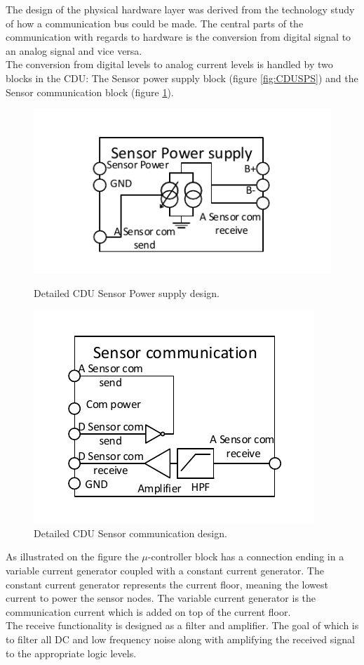 The design of the physical hardware layer was derived from the technology study of how a communication bus could be made. The central parts of the communication with regards to hardware is the conversion from digital signal to an analog signal and vice versa.\\ 
The conversion from digital levels to analog current levels is handled by two blocks in the CDU: The Sensor power supply block (figure \ref{fig:CDUSPS}) and the Sensor communication block (figure \ref{fig:CDUSC}).
\begin{figure}[H]
	\begin{minipage}[b]{0.45\linewidth}
	\centering
	\includegraphics[scale=1]{billeder/11ProjectDescription/CDUSPS}
	\caption{Detailed CDU Sensor Power supply design.}
	\label{fig:CDUSPS}
	\end{minipage}
	\hspace{0.5cm}
	\begin{minipage}[b]{0.45\linewidth}
	\centering
	\includegraphics[scale=1]{billeder/11ProjectDescription/CDUSC}
	\caption{Detailed CDU Sensor communication design.}
	\label{fig:CDUSC}
	\end{minipage}
\end{figure}
As illustrated on the figure the $\mu$-controller block has a connection ending in a variable current generator coupled with a constant current generator. The constant current generator represents the current floor, meaning the lowest current to power the sensor nodes. The variable current generator is the communication current which is added on top of the current floor.\\
The receive functionality is designed as a filter and amplifier. The goal of which is to filter all DC and low frequency noise along with amplifying the received signal to the appropriate logic levels.

